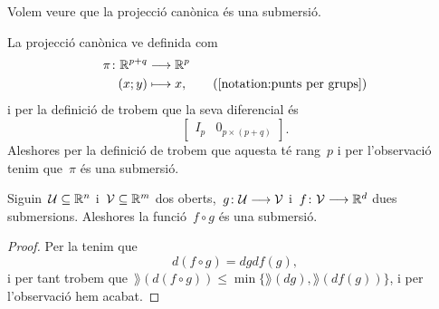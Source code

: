 \documentclass[../../main.tex]{subfiles}
\begin{document}
	\begin{example}
		\label{ex:la projecció canònica és una submersió}
		Volem veure que la projecció canònica és una submersió.
		\begin{solution}
			La projecció canònica ve definida com
			\begin{align*}
				\pi\colon\mathbb{R}^{p+q}&\longrightarrow\mathbb{R}^{p} \\
				(x;y)&\longmapsto x, \tag{\ref{notation:punts per grups}}
			\end{align*}
			i per la definició de  trobem que la seva diferencial és
			\[\left[\begin{array}{c|c}
			I_{p} & 0_{p\times(p+q)}
			\end{array}\right].\]
			Aleshores per la definició de  trobem que aquesta té rang~\(p\) i per l'observació  tenim que~\(\pi\) és una submersió.
		\end{solution}
	\end{example}
	\begin{proposition}
		\label{prop:la composició de submersions és submersió}
		Siguin~\(\mathcal{U}\subseteq\mathbb{R}^{n}\) i~\(\mathcal{V}\subseteq\mathbb{R}^{m}\) dos oberts,~\(g\colon\mathcal{U}\longrightarrow\mathcal{V}\) i~\(f\colon\mathcal{V}\longrightarrow\mathbb{R}^{d}\) dues submersions.
		Aleshores la funció~\(f\circ g\) és una submersió.
		\begin{proof}
			Per la  tenim que
			\[
			    d(f\circ g)=dgdf(g),
			\]
			i per tant trobem que~\(\rang(d(f\circ g))\leq\min\{\rang(dg),\rang(df(g))\}\), i per l'observació  hem acabat.
		\end{proof}
	\end{proposition}
\end{document}

